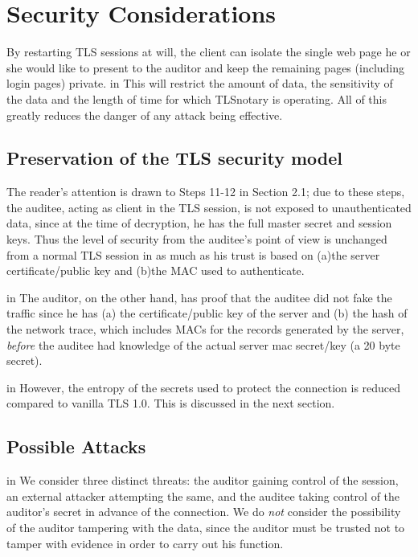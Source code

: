 \documentclass[10pt,a4paper]{article}
\begin{document}
\section{Security Considerations}

\noindent By restarting TLS sessions at will, the client can isolate the single web page he or she would like to present to the auditor and keep the remaining pages (including login pages) private.
 in
\noindent This will restrict the amount of data, the sensitivity of the data and the length of time for which TLSnotary is operating. All of this greatly reduces the danger of any attack being effective.

\subsection{Preservation of the TLS security model}

\noindent The reader's attention is drawn to Steps 11-12 in Section 2.1; due to these steps, the auditee, acting as client in the TLS session, is not exposed to unauthenticated data, since at the time of decryption, he has the full master secret and session keys. Thus the level of security from the auditee's point of view is unchanged from a normal TLS session in as much as his trust is based on (a)the server certificate/public key and (b)the MAC used to authenticate.

 in
\noindent The auditor, on the other hand, has proof that the auditee did not fake the traffic since he has (a) the certificate/public key of the server and (b) the hash of the network trace, which includes MACs for the records generated by the server, \emph{before} the auditee had knowledge of the actual server mac secret/key (a 20 byte secret).

 in
\noindent However, the entropy of the secrets used to protect the connection is reduced compared to vanilla TLS 1.0. This is discussed in the next section.

\subsection{Possible Attacks}
 in
\noindent We consider three distinct threats: the auditor gaining control of the session, an external attacker attempting the same, and the auditee taking control of the auditor's secret in advance of the connection. We do \emph{not} consider the possibility of the auditor tampering with the data, since the auditor must be trusted not to tamper with evidence in order to carry out his function.
\end{document}
